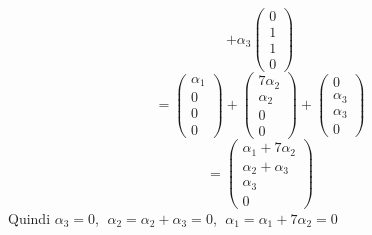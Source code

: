 \documentclass[a4paper]{article}
\theoremstyle{break}
\theoremstyle{break}
\theoremstyle{break}
\theoremstyle{break}
\begin{document}
\begin{example}
\begin{itemize}
\[      +
      \alpha_3 \begin{pmatrix} 0\\1\\1\\0 \end{pmatrix}
      \] 
      \[
      = \begin{pmatrix} 
        \alpha_1\\
        0\\
        0\\
        0
      \end{pmatrix} 
      +
      \begin{pmatrix} 
        7\alpha_2\\
        \alpha_2\\
        0\\
        0
      \end{pmatrix}
      +
      \begin{pmatrix} 
        0\\
        \alpha_3\\
        \alpha_3\\
        0
      \end{pmatrix}
      \] 
      \[
      = \begin{pmatrix} 
        \alpha_1 + 7\alpha_2\\
        \alpha_2 + \alpha_3\\
        \alpha_3\\
        0
      \end{pmatrix}
      \] 
     Quindi \( \alpha_3 = 0 \), \(\; \alpha_2 = \alpha_2 + \alpha_3 = 0 \),
     \(\; \alpha_1 = \alpha_1 + 7 \alpha_2 = 0 \) 


\end{itemize}
\end{example}
\end{document}
